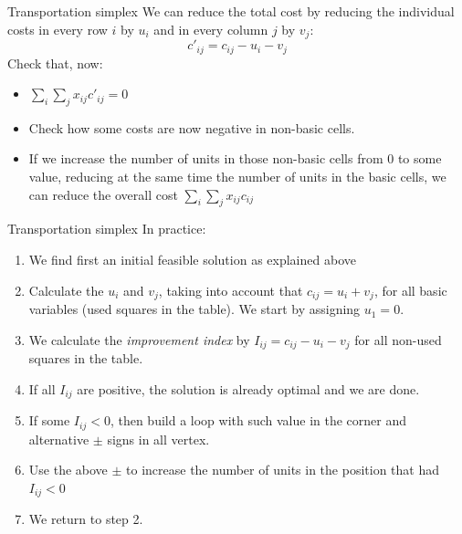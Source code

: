 \documentclass[c]{beamer}
\newcommand{\bottombox}[1]{\makebox[2em][r]{#1}\hspace*{\tabcolsep}\hspace*{2em}}%
\newcommand{\innerbox}[2]{%
    \begin{tabular}[b]{c|c}
       \rule{2em}{0pt}\rule[-2ex]{0pt}{5ex} & \makebox[2em]{#2} \\\cline{2-2}
       \multicolumn{2}{r}{{#1}\hspace*{1.5\tabcolsep}\hspace*{2em}\rule[-2ex]{0pt}{5ex}}
    \end{tabular}}
\begin{document}
\begin{frame}{Transportation simplex}
  We can reduce the total cost by reducing the individual costs in every row $i$ by $u_i$ and in every column $j$ by $v_j$:
  \[c'_{ij}=c_{ij}-u_i-v_j\]
  Check that, now:
  \begin{itemize}
    \item $\sum_i \sum_j x_{ij} c'_{ij}=0$
    \item Check how some costs are now negative in non-basic cells. 
    \item If we increase the number of units in those non-basic cells from 0 to some value, reducing at the same time the number of units in the basic cells, we can reduce the overall cost $\sum_i \sum_j x_{ij} c_{ij}$
  \end{itemize} 

\end{frame}

\begin{frame}{Transportation simplex}
In practice:
\begin{enumerate}
  \item We find first an initial feasible solution as explained above
  \item Calculate the $u_i$ and $v_j$, taking into account that $c_{ij}=u_i+v_j$, for all basic variables (used squares in the table). We start by assigning $u_1=0$.
  \item We calculate the {\em improvement index} by $I_{ij}=c_{ij}-u_i-v_j$ for all non-used squares in the table.
  \item If all $I_{ij}$ are positive, the solution is already optimal and we are done.
  \item If some $I_{ij}<0$, then build a loop with such value in the corner and alternative $\pm$ signs in all vertex. 
  \item Use the above $\pm$ to increase the number of units in the position that had $I_{ij}<0$
  \item We return to step 2.
\end{enumerate}
\end{frame}

\end{document}
